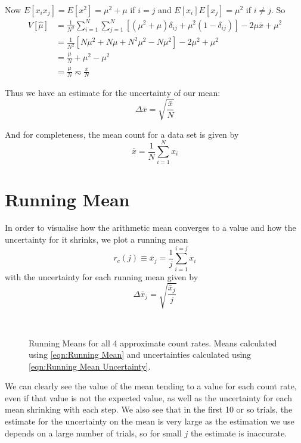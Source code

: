 \documentclass[12pt]{article}
\numberwithin{equation}{section}
\numberwithin{figure}{section}
\numberwithin{table}{section}
\begin{document}
\par Now $E[x_ix_j]=E[x^2]=\mu^2+\mu$ if $i=j$ and $E[x_i]E[x_j]=\mu^2$ if $i\neq j$. So 
\begin{align*}
    V[\hat\mu]&=\frac{1}{N^2}\sum_{i=1}^N\sum_{j=1}^N\left[(\mu^2+\mu)\delta_{ij}+\mu^2(1-\delta_{ij})\right]-2\mu\bar{x}+\mu^2\\
    &=\frac{1}{N^2}[N\mu^2+N\mu+N^2\mu^2-N\mu^2]-2\mu^2+\mu^2\\
    &=\frac{\mu}{N}+\mu^2-\mu^2\\
    &=\frac{\mu}{N}\eqsim\frac{\bar{x}}{N}
\end{align*}
\par Thus we have an estimate for the uncertainty of our mean: 
\begin{equation}
    \Delta \bar{x}=\sqrt{\frac{\bar{x}}{N}}
    \label{eqn:Mean Count Uncertainty}
\end{equation}
\par And for completeness, the mean count for a data set is given by
\begin{equation}
    \bar{x}=\frac{1}{N}\sum_{i=1}^N x_i
    \label{eqn:Mean Count}
\end{equation}

\section{Running Mean}\label{sec:Running Mean}
\par In order to visualise how the arithmetic mean converges to a value and how the uncertainty for it shrinks, we plot a running mean 
\begin{equation}
    r_c(j)\equiv\bar{x}_j=\frac{1}{j}\sum_{i=1}^{i=j}x_i
    \label{eqn:Running Mean}
\end{equation}
with the uncertainty for each running mean given by
\begin{equation}
    \Delta \bar{x}_j=\sqrt{\frac{\bar{x}_j}{j}}
    \label{eqn:Running Mean Uncertainty}
\end{equation}

\begin{figure}[H]%
    \centering
    \,
    \,
    \,
    \caption{Running Means for all 4 approximate count rates. Means calculated using \autoref{eqn:Running Mean} and uncertainties calculated using \autoref{eqn:Running Mean Uncertainty}.}
    \label{fig:Running Mean}
\end{figure}
\par We can clearly see the value of the mean tending to a value for each count rate, even if that value is not the expected value, as well as the uncertainty for each mean shrinking with each step. We also see that in the first 10 or so trials, the estimate for the uncertainty on the mean is very large as the estimation we use depends on a large number of trials, so for small $j$ the estimate is inaccurate.
\end{document}
